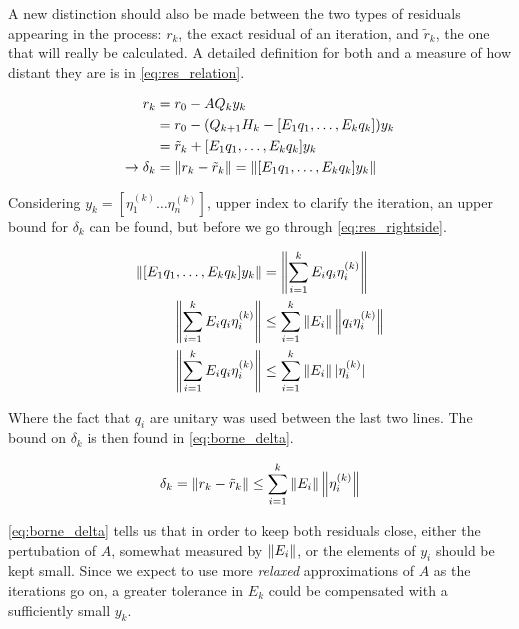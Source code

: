 A new distinction should also be made between the two types of residuals appearing in the process: $r_{k}$, the exact residual of an iteration, and $\tilde{r}_{k}$, the one that will really be calculated. A detailed definition for both and a measure of how distant they are is in \ref{eq:res_relation}.

\begin{align}\label{eq:res_relation}
    \begin{split}
        r_{k} &= r_{0} - AQ_{k}y_{k}\\
        &= r_{0} - (Q_{k+1}H_{k} - [E_{1}q_{1},\dots , E_{k}q_{k}])y_{k}\\
        &= \tilde{r}_{k} +[E_{1}q_{1},\dots , E_{k}q_{k}]y_{k}\\
        \rightarrow \delta_{k} &= \left\lVert r_{k} - \tilde{r}_{k}\right\rVert  = \left\lVert[E_{1}q_{1},\dots , E_{k}q_{k}]y_{k}\right\rVert
    \end{split}
\end{align}

Considering $y_{k} = [\eta_{1}^{(k)} \dots \eta_{n}^{(k)} ] $, upper index to clarify the iteration, an upper bound for $\delta_{k}$ can be found, but before we go through \ref{eq:res_rightside}.

\begin{align}\label{eq:res_rightside}
    \begin{split}
        \left\lVert[E_{1}q_{1},\dots , E_{k}q_{k}]y_{k}\right\rVert & = \left\lVert\sum_{i=1}^{k}E_{i}q_{i}\eta^{(k)}_{i}\right\rVert\\
        \left\lVert\sum_{i=1}^{k}E_{i}q_{i}\eta^{(k)}_{i}\right\rVert & \leq \sum_{i=1}^{k}\left\lVert E_{i}\right\rVert\left\lVert q_{i}\eta^{(k)}_{i}\right\rVert\\
        \left\lVert\sum_{i=1}^{k}E_{i}q_{i}\eta^{(k)}_{i}\right\rVert & \leq \sum_{i=1}^{k}\left\lVert E_{i}\right\rVert|\eta^{(k)}_{i}|
    \end{split}
\end{align}

Where the fact that $q_{i}$ are unitary was used between the last two lines. The bound on $\delta_{k}$ is then found in \ref{eq:borne_delta}.


\begin{equation}\label{eq:borne_delta}
    \delta_{k} = \left\lVert r_{k} - \tilde{r}_{k}\right\rVert \leq \sum_{i=1}^{k} \left\lVert E_{i}\right\rVert \left\lVert\eta_{i}^{(k)}\right\rVert
\end{equation}

\ref{eq:borne_delta} tells us that in order to keep both residuals close, either the pertubation of $A$, somewhat measured by $\left\lVert E_{i}\right\rVert$, or the elements of $y_{i}$ should be kept small. Since we expect to use more \textit{relaxed} approximations of $A$ as the iterations go on, a greater tolerance in $E_{k}$ could be compensated with a sufficiently small $y_{k}$.


